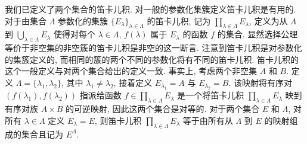 \documentclass[../../main.tex]{subfiles}
\begin{document}
我们已定义了两个集合的笛卡儿积. 对一般的参数化集簇定义笛卡儿积是有用的. 对于由集合 $\Lambda$ 参数化的集簇 $\{E_{\lambda}\}_{\lambda\in\Lambda}$ 的笛卡儿积, 记为 $\prod_{\lambda\in\Lambda}E_{\lambda}$, 定义为从 $\Lambda$ 到 $\bigcup_{\lambda\in\Lambda}E_{\lambda}$ 使得对每个 $\lambda\in\Lambda$, $f(\lambda)$ 属于 $E_{\lambda}$ 的函数 $f$ 的集合. 显然选择公理等价于非空集的非空簇的笛卡儿积是非空的这一断言. 注意到笛卡儿积是对参数化的集簇定义的, 而相同的簇的两个不同的参数化将有不同的笛卡儿积. 笛卡儿积的这个一般定义与对两个集合给出的定义一致. 事实上, 考虑两个非空集 $A$ 和 $B$. 定义 $\Lambda=\{\lambda_{1},\lambda_{2}\}$, 其中 $\lambda_{1}\neq\lambda_{2}$, 接着定义 $E_{\lambda_{1}}=A$ 与 $E_{\lambda_{2}}=B$. 该映射将有序对 $(f(\lambda_{1}),f(\lambda_{2}))$ 指派给函数 $f\in\prod_{\lambda\in\Lambda}E_{\lambda}$ 是一个将笛卡儿积 $\prod_{\lambda\in\Lambda}E_{\lambda}$ 映到有序对族 $A\times B$ 的可逆映射, 因此这两个集合是对等的. 对于两个集合 $E$ 和 $\Lambda$, 对所有 $\lambda\in\Lambda$ 定义 $E_{\lambda}=E$, 则笛卡儿积 $\prod_{\lambda\in\Lambda}E_{\lambda}$ 等于由所有从 $\Lambda$ 到 $E$ 的映射组成的集合且记为 $E^{\Lambda}$.
\end{document}
